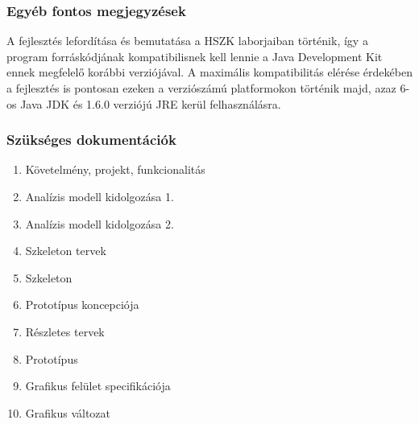 %
   \subsubsection{Egyéb fontos megjegyzések}
	A fejlesztés lefordítása és bemutatása a HSZK laborjaiban történik, így a program forráskódjának kompatibilisnek kell lennie a Java Development Kit ennek megfelelő korábbi verziójával. A maximális kompatibilitás elérése érdekében a fejlesztés is pontosan ezeken a verziószámú platformokon történik majd, azaz 6-os Java JDK és 1.6.0 verziójú JRE kerül felhasználásra.

    \subsubsection{Szükséges dokumentációk}
	\begin{enumerate}
	\item Követelmény, projekt, funkcionalitás
	\item Analízis modell kidolgozása 1.
	\item Analízis modell kidolgozása 2.
	\item Szkeleton tervek
	\item Szkeleton
	\item Prototípus koncepciója
	\item Részletes tervek
	\item Prototípus
	\item Grafikus felület specifikációja
	\item Grafikus változat
	\end{enumerate}
 
